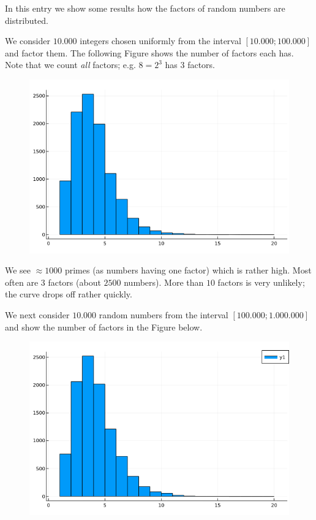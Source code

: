 
In this entry we show some results how the factors of random numbers are distributed.

We consider $10.000$ integers chosen uniformly from the interval $[10.000 ; 100.000]$ and factor them. The following Figure shows the number of factors each has. Note that we count \emph{all} factors; e.g. $8 = 2^3$ has $3$ factors.

\begin{figure}[H]
    \centering
    \includegraphics[scale=0.5]{images/primes_03_01.png}
\end{figure}


We see $\approx 1000$ primes (as numbers having one factor) which is rather high. Most often are $3$ factors (about $2500$ numbers). More than $10$ factors is very unlikely; the curve drops off rather quickly.

We next consider $10.000$ random numbers from the interval $[100.000 ; 1.000.000]$ and show the number of factors in the Figure below.

\begin{figure}[H]
    \centering
    \includegraphics[scale=0.5]{images/primes_03_02.png}
\end{figure}


